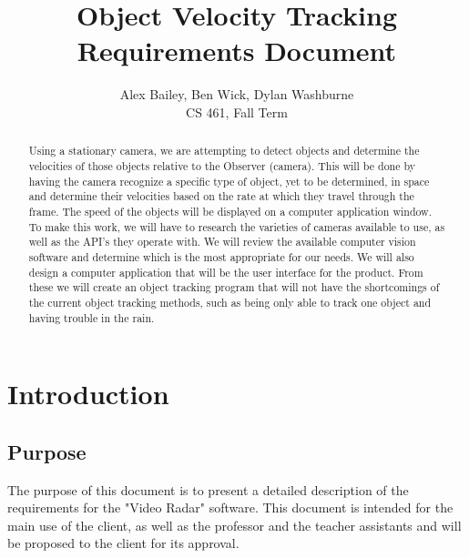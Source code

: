 \documentclass[letterpaper,10pt,onecolumn,draftclsnofoot]{IEEEtran}
\title{Object Velocity Tracking Requirements Document}
\author{Alex Bailey, Ben Wick, Dylan Washburne\\CS 461, Fall Term}
\begin{document}
\begin{titlepage}

\maketitle

\begin{abstract}
Using a stationary camera, we are attempting to detect objects and determine the velocities of those objects relative to the Observer (camera).
This will be done by having the camera recognize a specific type of object, yet to be determined, in space and determine their velocities based on the rate at which they travel through the frame.
The speed of the objects will be displayed on a computer application window.
To make this work, we will have to research the varieties of cameras available to use, as well as the API’s they operate with.
We will review the available computer vision software and determine which is the most appropriate for our needs.
We will also design a computer application that will be the user interface for the product.
From these we will create an object tracking program that will not have the shortcomings of the current object tracking methods, such as being only able to track one object and having trouble in the rain.

 
\end{abstract}

\end{titlepage}


\section{Introduction}
\subsection{Purpose}
The purpose of this document is to present a detailed description of the requirements for the "Video Radar" software.
This document is intended for the main use of the client, as well as the professor and the teacher assistants and will be proposed to the client for its approval.
\end{document}
